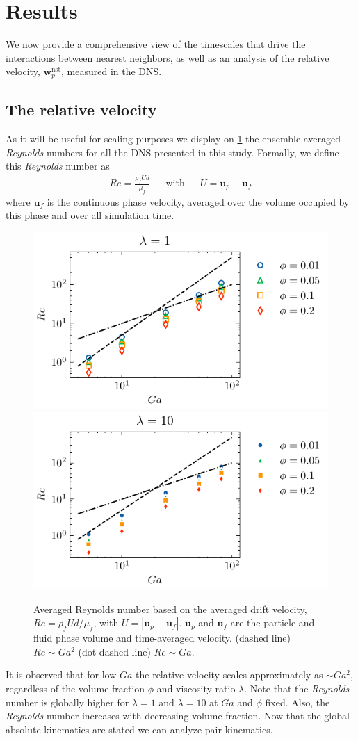 \section{Results}
\label{sec:results}

We now provide a comprehensive view of the timescales that drive the interactions between nearest neighbors, as well as an analysis of the relative velocity, $\textbf{w}_p^\text{nst}$, measured in the DNS.

\subsection{The relative velocity}

As it will be useful for scaling purposes we display on \ref{fig:Reall} the ensemble-averaged \textit{Reynolds} numbers for all the DNS presented in this study.
Formally, we define this \textit{Reynolds} number as
\begin{align*}
    Re = \frac{\rho_f U d}{\mu_f} && \text{with} && U = \textbf{u}_p - \textbf{u}_f
\end{align*}
where $\textbf{u}_f$ is the continuous phase velocity, averaged over the volume occupied by this phase and over all simulation time. 
\begin{figure}[h!]
    \centering
    \includegraphics[height = 0.25\textwidth]{image/HOMOGENEOUS_final/CA/Re_l_1.pdf}
    \includegraphics[height = 0.25\textwidth]{image/HOMOGENEOUS_final/CA/Re_l_10.pdf}
    \caption{
        Averaged Reynolds number based on the averaged drift velocity, $Re = \rho_f U d /\mu_f$, with $U = |\textbf{u}_p - \textbf{u}_f|$.
        $\textbf{u}_p$ and $\textbf{u}_f$ are the particle and fluid phase volume and time-averaged velocity.
        (dashed line) $Re \sim Ga^2$ (dot dashed line) $Re \sim Ga$. 
    }
    \label{fig:Reall}
\end{figure}
It is observed that for low $Ga$ the relative velocity scales approximately as $\sim Ga^2$, regardless of the volume fraction $\phi$ and viscosity ratio $\lambda$. 
Note that the \textit{Reynolds} number is globally higher for $\lambda  =1$ and $\lambda = 10$ at $Ga$ and $\phi$ fixed. 
Also, the \textit{Reynolds} number increases with decreasing volume fraction. 
Now that the global absolute kinematics are stated we can analyze pair kinematics. 

